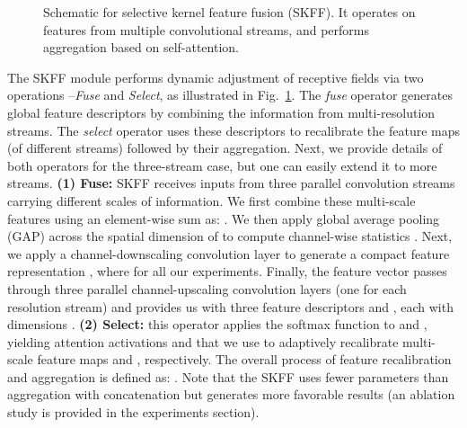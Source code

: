 \documentclass[runningheads]{llncs}
\begin{document}
\begin{figure}[t]
\begin{center}
\end{center}
\vspace*{-6mm}
\caption{\small Schematic for selective kernel feature fusion (SKFF). It operates on features from multiple convolutional streams, and performs aggregation based on self-attention.}
\label{fig:skff}
\vspace*{-2em}
\end{figure}

The SKFF module performs dynamic adjustment of receptive fields via two operations --{\emph{Fuse} and \emph{Select}, as illustrated in Fig.~\ref{fig:skff}}.
The \emph{fuse} operator generates global feature descriptors by combining the information from multi-resolution streams. The \emph{select} operator uses these descriptors to recalibrate the feature maps (of different streams) followed by their aggregation. 
Next, we provide details of both operators for the three-stream case, but one can easily extend it to more streams. 
\textbf{(1) Fuse:} SKFF receives inputs from three parallel convolution streams carrying different scales of information. 
We first combine these multi-scale features using an element-wise sum as: . 
We then apply global average pooling (GAP) across the spatial dimension of  to compute channel-wise statistics . 
Next, we apply a channel-downscaling convolution layer to generate a compact feature representation , where  for all our experiments.
Finally, the feature vector  passes through three parallel channel-upscaling convolution layers (one for each resolution stream) and provides us with three feature descriptors  and , each with dimensions . 
\textbf{(2) Select:} this operator applies the softmax function to  and , yielding attention activations  and  that we use to adaptively recalibrate multi-scale feature maps  and , respectively. The overall process of feature recalibration and aggregation is defined as: . 
Note that the SKFF uses  fewer parameters than aggregation with concatenation but generates more favorable results (an ablation study is provided in the experiments section). 
\end{document}
